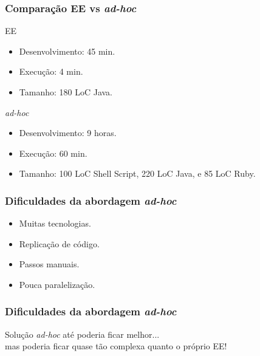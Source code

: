 \documentclass{beamer}
\newcommand\adhoc{\emph{ad-hoc}\xspace}
\begin{document}
\begin{frame}
\frametitle{Comparação EE vs \adhoc}

\begin{block}{EE}
\begin{itemize}
\item Desenvolvimento: 45 min.
\item Execução: 4 min.
\item Tamanho: 180 LoC Java.
\end{itemize}
\end{block}

\vspace{0.6cm}

\begin{block}{\adhoc}
\begin{itemize}
\item Desenvolvimento: 9 horas.
\item Execução: 60 min.
\item Tamanho: 100 LoC Shell Script, 220 LoC Java, e 85 LoC Ruby.
\end{itemize}
\end{block}

\end{frame}



\begin{frame}
\frametitle{Dificuldades da abordagem \adhoc}

\begin{itemize}
\item Muitas tecnologias.
\item Replicação de código.
\item Passos manuais.
\item Pouca paralelização.
\end{itemize}

\end{frame}


\begin{frame}
\frametitle{Dificuldades da abordagem \adhoc}

Solução \adhoc até poderia ficar melhor... \\
mas poderia ficar quase tão complexa quanto o próprio EE!

\end{frame}


\end{document}
